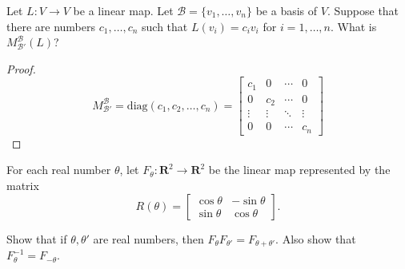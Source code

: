 \begin{exercise}
    Let $L: V\to V$ be a linear map. Let $\mathscr{B} = \{ v_{1}, \ldots, v_{n} \}$ be a basis of $V$. Suppose that there are numbers $c_{1}, \ldots, c_{n}$ such that $L(v_{i}) = c_{i}v_{i}$ for $i = 1,\ldots, n$. What is $M^{\mathscr{B}}_{\mathscr{B'}}(L)$?
\end{exercise}

\begin{proof}
    \[
        M^{\mathscr{B}}_{\mathscr{B'}} =
        \text{diag}(c_{1}, c_{2}, \ldots, c_{n}) =
        \begin{bmatrix}
            c_{1}  & 0      & \cdots & 0      \\
            0      & c_{2}  & \cdots & 0      \\
            \vdots & \vdots & \ddots & \vdots \\
            0      & 0      & \cdots & c_{n}
        \end{bmatrix}
    \]
\end{proof}

\begin{exercise}
    For each real number $\theta$, let $F_{\theta}: \mathbf{R}^{2} \to \mathbf{R}^{2}$ be the linear map represented by the matrix
    \[
        R(\theta) = \begin{bmatrix}
            \cos\theta & -\sin\theta \\
            \sin\theta & \cos\theta
        \end{bmatrix}.
    \]

    Show that if $\theta, \theta'$ are real numbers, then $F_{\theta}F_{\theta'} = F_{\theta + \theta'}$. Also show that $F_{\theta}^{-1} = F_{-\theta}$.
\end{exercise}

